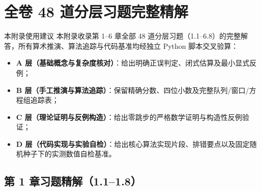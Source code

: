 \renewcommand{\chapWatermarkNum}{\thechapter}
\renewcommand{\chaptermark}[1]{\markboth{附录 \thechapter\quad #1}{}}
\chapter{全卷 48 道分层习题完整精解}
\label{app:solutions}

\begin{chapIntro}{本附录使用建议}
本附录收录第 1--6 章全部 48 道分层习题（1.1--6.8）的完整解答，所有算术推演、算法追踪与代码基准均经独立 Python 脚本交叉验算：
\begin{itemize}
  \item \textbf{A 层（基础概念与复杂度核对）}：给出明确正误判定、闭式估算及最小显式反例；
  \item \textbf{B 层（手工推演与算法追踪）}：保留精确分数、四位小数及完整队列/窗口/方程组追踪表；
  \item \textbf{C 层（理论证明与反例构造）}：给出零跳步的严格数学证明与构造性反例验证；
  \item \textbf{D 层（代码实现与实验自检）}：给出核心算法实现片段、排错要点以及固定随机种子下的实测数值自检基准。
\end{itemize}
\end{chapIntro}

\section{第 1 章习题精解（1.1--1.8）}

